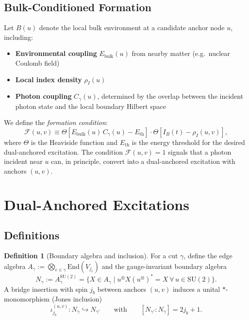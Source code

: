 \documentclass[11pt]{article}
\newcommand{\Index}[2]{\left[#1:#2\right]}
\newcommand{\End}{\mathrm{End}}
\theoremstyle{plain}
\theoremstyle{definition}
\newtheorem{definition}[theorem]{Definition}
\begin{document}
\subsection{Bulk-Conditioned Formation}
Let $B(u)$ denote the local bulk environment at a candidate anchor node $u$, including:
\begin{itemize}
  \item \textbf{Environmental coupling} $E_{\mathrm{bulk}}(u)$ from nearby matter (e.g.\ nuclear Coulomb field)
  \item \textbf{Local index density} $\rho_I(u)$
  \item \textbf{Photon coupling} $C_{\gamma}(u)$, determined by the overlap between the incident photon state and the local boundary Hilbert space
\end{itemize}
We define the \emph{formation condition}:
\begin{equation}
  \mathcal{F}(u,v) \equiv \Theta\!\left[ E_{\mathrm{bulk}}(u) \, C_{\gamma}(u) - E_{\mathrm{th}} \right] \cdot \Theta\!\left[ I_B(t) - \rho_I(u,v) \right],
\end{equation}
where $\Theta$ is the Heaviside function and $E_{\mathrm{th}}$ is the energy threshold for the desired dual-anchored excitation.
The condition $\mathcal{F}(u,v)=1$ signals that a photon incident near $u$ can, in principle, convert into a dual-anchored excitation with anchors $(u,v)$.

\section{Dual-Anchored Excitations}
\label{sec:dual-anchored}

\subsection{Definitions}
\begin{definition}[Boundary algebra and inclusion]
  For a cut $\gamma$, define the edge algebra $A_\gamma := \bigotimes_{e\in\gamma} \End(V_{j_e})$ and the gauge-invariant boundary algebra
  \[
    N_\gamma := A_\gamma^{\mathrm{SU}(2)} = \{ X\in A_\gamma \mid u^{\otimes} X (u^{\otimes})^\ast = X\ \forall\,u\in \mathrm{SU}(2)\}.
  \]
  A bridge insertion with spin $j_b$ between anchors $(u,v)$ induces a unital $*$-monomorphism (Jones inclusion)
  \[
    \iota^{(u,v)}_{j_b}: N_\gamma \hookrightarrow N_{\gamma'} \qquad\text{with}\qquad \Index{N_{\gamma'}}{N_\gamma}=2j_b+1.
  \]
\end{definition}
\end{document}
